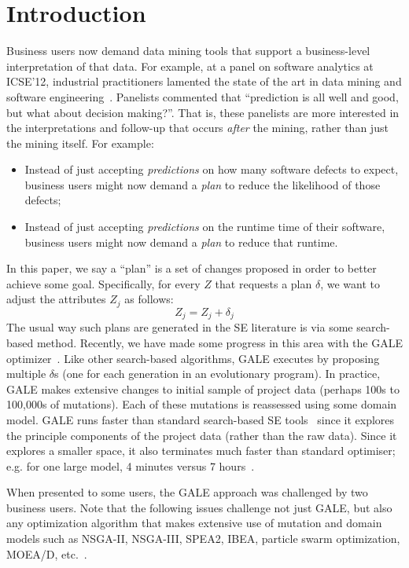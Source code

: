 \documentclass[conference]{IEEEtran}
\newcommand{\bi}{\begin{itemize}}
\newcommand{\ei}{\end{itemize}}
\begin{document}
\section{Introduction}
Business  users   now demand   data mining tools
that  support a  business-level
interpretation of that data. For example,
at a  panel on software analytics at ICSE'12,
industrial practitioners lamented the state of the art in data mining
and software engineering~\cite{menzies12a}. Panelists commented that
``prediction is all well and good, but what about decision
making?''. That is, these panelists are more interested in the interpretations
and follow-up
that occurs {\em after} the mining, rather than just  the mining itself. For example:
\bi
\item 
Instead of just accepting  {\em predictions} on how many 
 software defects
to expect,  business users might now demand a {\em plan} to
reduce the likelihood of those defects;
\item Instead of just accepting {\em predictions} on the runtime
time of their software, business users might now demand
a {\em plan} to reduce that runtime.
\ei
In this paper, we say   a ``plan'' is a  set of changes
proposed  in order to better achieve some goal. 
Specifically, for every $Z$  that requests a plan $\delta$, we want
to adjust the attributes $Z_j$ as follows:
\begin{equation}\label{eq:one}
Z_j = Z_j + \delta_j
\end{equation}
The usual way such plans are generated in the SE literature
is via some search-based method. Recently, we have made  some progress
in this area with the  GALE optimizer~\cite{krall14}. 
Like other search-based algorithms,
 GALE executes by proposing multiple $\delta$s
 (one for each generation in an evolutionary program).
 In practice, GALE makes
 extensive changes to initial sample of project data
 (perhaps 
100s to 100,000s of mutations). Each of these mutations
is reassessed using some domain model.
GALE runs faster than standard search-based SE tools~\cite{deb00a,zit02} since
it explores  the principle components
 of the project data (rather than   the raw data). Since it explores
 a smaller space, it also
 terminates much faster than standard optimiser; e.g. for one large model, 4 minutes versus 7 hours~\cite{krall14}. 

When presented to some  users, the GALE approach was challenged by
two business users.   Note that the following issues
challenge not just GALE, but also  any  optimization algorithm  that makes
extensive use of mutation  and domain models such as
NSGA-II, NSGA-III, SPEA2, IBEA, particle swarm optimization, MOEA/D, etc.~\cite{deb00a,zit02,zit04,%
deb14,Cui2005a,zhang07:TEC}.
\end{document}
